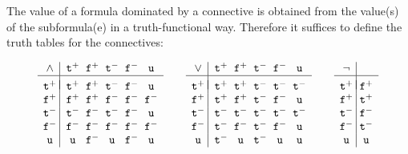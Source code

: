 \documentclass{\filespath jancl}
\newcommand{\twts}{{{\tt t}^+}}
\newcommand{\twfs}{{{\tt f}^+}}
\newcommand{\twti}{{{\tt t}^-}}
\newcommand{\twfi}{{{\tt f}^-}}
\newcommand{\twu}{{\tt u}}
\begin{document}
\begin{definition}\label{Def:truth-tables}    
  The value of a formula dominated by a connective is obtained from the
  value(s) of the subformula(e) in a truth-functional way. Therefore it
  suffices to define the truth tables for the connectives:

\[\begin{array}{c@{\;}|@{\;\;}c@{\;\;}c@{\;\;}c@{\;\;}c@{\;\;}c}
\land & \twts & \twfs & \twti & \twfi & \twu\\ \hline\\[-1.9ex]
\twts & \twts & \twfs & \twti & \twfi & \twu\\
\twfs & \twfs & \twfs & \twfi & \twfi & \twfi\\
\twti & \twti & \twfi & \twti & \twfi & \twu\\
\twfi & \twfi & \twfi & \twfi & \twfi & \twfi\\
\twu  & \twu  & \twfi & \twu  & \twfi & \twu
\end{array}\qquad
\begin{array}{c@{\;}|@{\;\;}c@{\;\;}c@{\;\;}c@{\;\;}c@{\;\;}c}
\lor  & \twts & \twfs & \twti & \twfi & \twu\\ \hline\\[-1.9ex]
\twts & \twts & \twts & \twti & \twti & \twti\\
\twfs & \twts & \twfs & \twti & \twfi & \twu\\
\twti & \twti & \twti & \twti & \twti & \twti\\
\twfi & \twti & \twfi & \twti & \twfi & \twu\\
\twu  & \twti & \twu  & \twti & \twu  & \twu
\end{array}\qquad
\begin{array}{c@{\;}|@{\;}c}
\neg  & \\ \hline\\[-1.9ex]
\twts & \twfs   \\
\twfs & \twts  \\
\twti & \twfi \\
\twfi & \twti \\
\twu  & \twu
\end{array}\]\vspace{0ex}


\end{definition}
\end{document}
